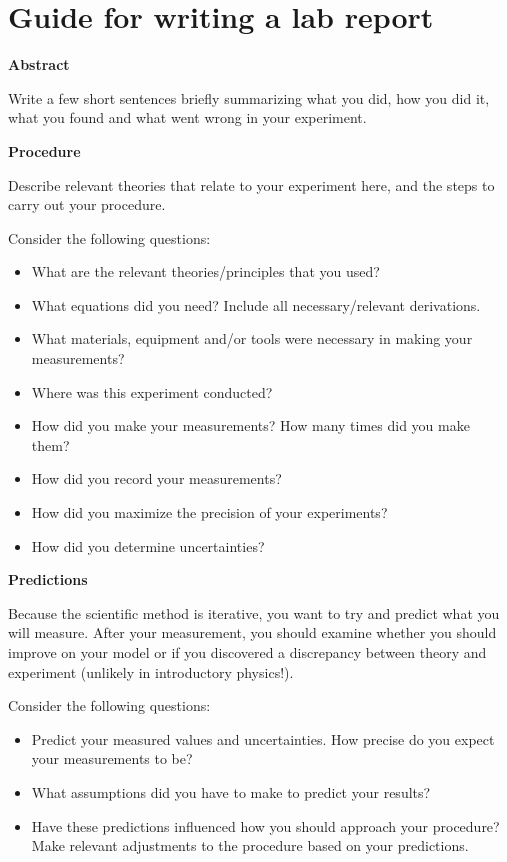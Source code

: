 \newpage
\section{Guide for writing a lab report}
 \vspace{0.25cm}
\textbf{Abstract}

Write a few short sentences briefly summarizing what you did, how you did it, what you found and what went wrong in your experiment.

\textbf{Procedure}

Describe relevant theories that relate to your experiment here, and the steps to carry out your procedure. 

Consider the following questions:
\begin{itemize}
\item What are the relevant theories/principles that you used? 
\item What equations did you need? Include all necessary/relevant derivations.
\item What materials, equipment and/or tools were necessary in making your measurements?
\item Where was this experiment conducted?
\item How did you make your measurements? How many times did you make them?
\item How did you record your measurements?
\item How did you maximize the precision of your experiments?
\item How did you determine uncertainties?
\end{itemize}

\textbf{Predictions}

Because the scientific method is iterative, you want to try and predict what you will measure. After your measurement, you should examine whether you should improve on your model or if you discovered a discrepancy between theory and experiment (unlikely in introductory physics!).

Consider the following questions:
\begin{itemize}
\item Predict your measured values and uncertainties. How precise do you expect your measurements to be?
\item What assumptions did you have to make to predict your results?
\item Have these predictions influenced how you should approach your procedure? Make relevant adjustments to the procedure based on your predictions.
\end{itemize}


